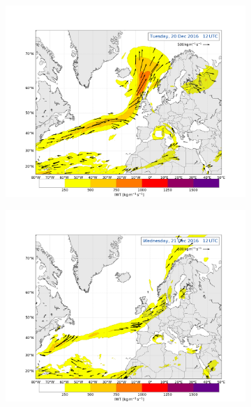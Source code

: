 \begin{figure}[h!]
	\centering
	\begin{subfigure}[b]{0.49\textwidth}
		\includegraphics[trim={4.2cm 3.9cm 4.3cm 5.1cm},clip,
		width=\textwidth]{./fig_Atm_Riv/20161220_12}
		\caption{}\label{fig:AR20}
	\end{subfigure}
	\begin{subfigure}[b]{0.49\textwidth}
		\includegraphics[trim={4.2cm 3.9cm 4.3cm 5.1cm},clip,
		width=\textwidth]{./fig_Atm_Riv/20161221_12}
		\caption{}\label{fig:AR21}
	\end{subfigure}

\end{figure}
